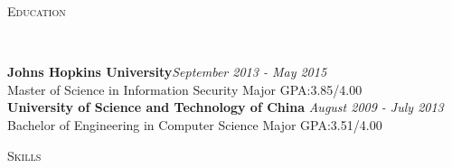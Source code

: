\documentclass[3pt]{article}
\newenvironment{changemargin}[2]{%
  \begin{list}{}{%
    \setlength{\topsep}{0pt}%
    \setlength{\leftmargin}{#1}%
    \setlength{\rightmargin}{#2}%
    \setlength{\listparindent}{\parindent}%
    \setlength{\itemindent}{\parindent}%
    \setlength{\parsep}{\parskip}%
  }%
  \item[]}{\end{list}
}
\newcommand{\lineover}{
	\begin{changemargin}{-0.05in}{-0.05in}
		\vspace*{-8pt}
		\hrulefill \\
		\vspace*{-2pt}
	\end{changemargin}
}
\newcommand{\header}[1]{
	\begin{changemargin}{-0.5in}{-0.5in}
		{\Large \scshape{#1}}\\
  	\lineover
	\end{changemargin}
}
\newcommand{\contact}[4]{
	\begin{changemargin}{-0.5in}{-0.5in}
		\begin{center}
			{\Large \scshape {#1}}\\ \smallskip
			{#2}\\ \smallskip
			{#3}\\ \smallskip
			{#4}\smallskip
		\end{center}
	\end{changemargin}
}
\newenvironment{body} {
	\vspace*{-16pt}
	\begin{changemargin}{-0.25in}{-0.5in}
  }	
	{\end{changemargin}
}
\begin{document}






\header{Education}

\begin{body}
	\vspace{17pt}
	\textbf{Johns Hopkins University}{}\hfill \emph{September 2013 - May 2015}{} \\
	Master of Science in Information Security \hfill Major GPA:3.85/4.00\\
  \smallskip
	\textbf{University of Science and Technology of China} \hfill \emph{August 2009 - July 2013} \\
	Bachelor of Engineering in Computer Science \hfill Major GPA:3.51/4.00\\
\end{body}

\smallskip

\header{Skills}
\end{document}
